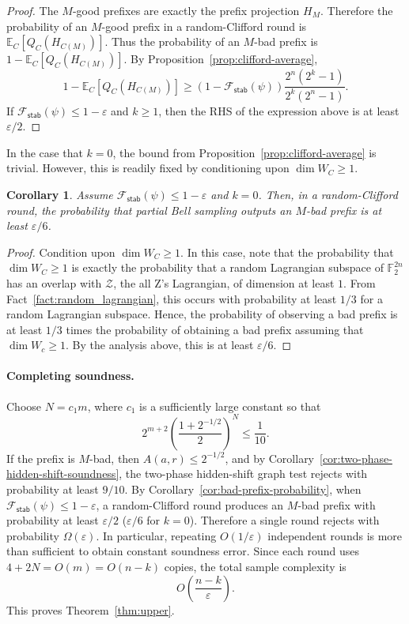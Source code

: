 \documentclass[11pt]{article}
\newtheorem{corollary}[theorem]{Corollary}
\newcommand{\eps}{\varepsilon}
\newcommand{\Fe}{\ensuremath{\mathcal{F}}}
\newcommand{\F}{\mathbb{F}}
\begin{document}
\begin{proof}
The $M$-good prefixes are exactly the prefix projection $H_M$.  Therefore
the probability of an $M$-good prefix in a random-Clifford round is
$    \mathbb E_C [Q_C(H_{C(M)})]$. 
Thus the probability of an $M$-bad prefix is
$    1-\mathbb E_C [Q_C(H_{C(M)})]$. 
By Proposition~\ref{prop:clifford-average},
$$
    1-\mathbb E_C [Q_C(H_{C(M)})]
    \ge
    (1-\Fe_{\textsf{stab}}(\psi))
    \frac{2^n(2^k-1)}{2^k(2^n-1)}.
$$
If $\Fe_{\textsf{stab}}(\psi)\le 1-\varepsilon$ and $k\ge 1$, then
the RHS of the expression above is at least $\varepsilon/2$.
\end{proof}

In the case that $k=0$, the bound from Proposition~\ref{prop:clifford-average} is trivial. However, this is readily fixed by conditioning upon $\dim W_C \geq 1$.

\begin{corollary}
    Assume $\Fe_{\textsf{stab}}(\psi)\le 1-\varepsilon$ and $k= 0$.  Then, in a random-Clifford
round, the probability that partial Bell sampling outputs an $M$-bad prefix is
at least $\eps/6$.
\end{corollary}
\begin{proof}
    Condition upon $\dim W_C \geq 1$. In this case, note that the probability that $\dim W_C \geq 1$ is exactly the probability that a random Lagrangian subspace of $\F_2^{2n}$ has an overlap with $\mathcal{Z}$, the all Z's Lagrangian, of dimension at least $1$. From Fact~\ref{fact:random_lagrangian}, this occurs with probability at least $1/3$ for a random Lagrangian subspace. Hence, the probability of observing a bad prefix is at least $1/3$ times the probability of obtaining a bad prefix assuming that $\dim W_c \geq 1$. By the analysis above, this is at least $\eps/6$. 
\end{proof}

\paragraph{Completing soundness.}
Choose $N=c_1m$, where $c_1$ is a sufficiently large constant so
that
$$
    2^{m+2}
    \left(\frac{1+2^{-1/2}}2\right)^N
    \le \frac1{10}.
$$
If the prefix is $M$-bad, then $A(a,r)\le 2^{-1/2}$, and by
Corollary~\ref{cor:two-phase-hidden-shift-soundness}, the two-phase hidden-shift graph test
rejects with probability at least $9/10$. By Corollary~\ref{cor:bad-prefix-probability}, when
$\Fe_{\textsf{stab}}(\psi)\le 1-\varepsilon$, a random-Clifford round produces
an $M$-bad prefix with probability at least $\eps/2$ ($\eps/6$ for $k=0$). Therefore a single round
rejects with probability $\Omega(\varepsilon)$.  In
particular, repeating $O(1/\varepsilon)$ independent rounds is more than
sufficient to obtain constant soundness error.  Since each round uses
$4+2N=O(m)=O(n-k)$ copies, the total sample complexity is
$$
    O\left(\frac{n-k}{\varepsilon}\right).
$$
This proves Theorem~\ref{thm:upper}.
\end{document}
